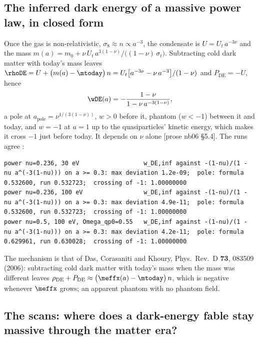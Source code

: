 \subsection{The inferred dark energy of a massive power law, in closed form}
\label{sec:9.7}

Once the gas is non-relativistic, $\sigma_8\approx n\propto a^{-3}$, the condensate is $U=U_t\,a^{-3\nu}$ and the
mass $m(a)=m_0+\nu\,U_t\,a^{3(1-\nu)}/\bigl((1-\nu)\,\sigma_t\bigr)$. Subtracting cold dark matter with today's
mass leaves $\rhoDE=U+\bigl(m(a)-\mtoday\bigr)\,n=U_t\bigl[a^{-3\nu}-\nu\,a^{-3}\bigr]/(1-\nu)$ and $P_{\mathrm{DE}}=-U$,
hence
\[
  \wDE(a)=-\frac{1-\nu}{1-\nu\,a^{-3(1-\nu)}} ,
\]
a pole at $a_{\mathrm{pole}}=\nu^{1/(3(1-\nu))}$, $w>0$ before it, phantom ($w<-1$) between it and today, and
$w=-1$ at $a=1$ up to the quasiparticles' kinetic energy, which makes it cross $-1$ just before today. It
depends on $\nu$ alone [prose nb06 \S5.4]. The runs agree :
\begin{Verbatim}[fontsize=\scriptsize]
power nu=0.236, 30 eV                  w_DE,inf against -(1-nu)/(1 - nu a^(-3(1-nu))) on a >= 0.3: max deviation 1.2e-09;  pole: formula 0.532600, run 0.532723;  crossing of -1: 1.00000000
power nu=0.236, 100 eV                 w_DE,inf against -(1-nu)/(1 - nu a^(-3(1-nu))) on a >= 0.3: max deviation 4.9e-11;  pole: formula 0.532600, run 0.532723;  crossing of -1: 1.00000000
power nu=0.5, 100 eV, Omega_qp0=0.55   w_DE,inf against -(1-nu)/(1 - nu a^(-3(1-nu))) on a >= 0.3: max deviation 4.2e-11;  pole: formula 0.629961, run 0.630028;  crossing of -1: 1.00000000
\end{Verbatim}
The mechanism is that of Das, Corasaniti and Khoury, Phys.\ Rev.\ D \textbf{73}, 083509 (2006): subtracting
cold dark matter with today's mass when the mass was different leaves
$\rho_{\mathrm{DE}}+P_{\mathrm{DE}}\approx\bigl(\meffx(a)-\mtoday\bigr)\,n$, which is negative whenever $\meffx$
grows; an apparent phantom with no phantom field.

\subsection{The scans: where does a dark-energy fable stay massive through the matter era?}
\label{sec:9.8}

